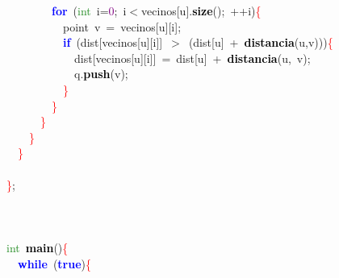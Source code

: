 \mbox{}\ \ \ \ \ \ \ \ \textbf{\textcolor{Blue}{for}}\ \textcolor{BrickRed}{(}\textcolor{ForestGreen}{int}\ i\textcolor{BrickRed}{=}\textcolor{Purple}{0}\textcolor{BrickRed}{;}\ i\textcolor{BrickRed}{$<$}vecinos\textcolor{BrickRed}{[}u\textcolor{BrickRed}{].}\textbf{\textcolor{Black}{size}}\textcolor{BrickRed}{();}\ \textcolor{BrickRed}{++}i\textcolor{BrickRed}{)}\textcolor{Red}{\{} \\
\mbox{}\ \ \ \ \ \ \ \ \ \ point\ v\ \textcolor{BrickRed}{=}\ vecinos\textcolor{BrickRed}{[}u\textcolor{BrickRed}{][}i\textcolor{BrickRed}{];} \\
\mbox{}\ \ \ \ \ \ \ \ \ \ \textbf{\textcolor{Blue}{if}}\ \textcolor{BrickRed}{(}dist\textcolor{BrickRed}{[}vecinos\textcolor{BrickRed}{[}u\textcolor{BrickRed}{][}i\textcolor{BrickRed}{]]}\ \textcolor{BrickRed}{$>$}\ \textcolor{BrickRed}{(}dist\textcolor{BrickRed}{[}u\textcolor{BrickRed}{]}\ \textcolor{BrickRed}{+}\ \textbf{\textcolor{Black}{distancia}}\textcolor{BrickRed}{(}u\textcolor{BrickRed}{,}v\textcolor{BrickRed}{)))}\textcolor{Red}{\{} \\
\mbox{}\ \ \ \ \ \ \ \ \ \ \ \ dist\textcolor{BrickRed}{[}vecinos\textcolor{BrickRed}{[}u\textcolor{BrickRed}{][}i\textcolor{BrickRed}{]]}\ \textcolor{BrickRed}{=}\ dist\textcolor{BrickRed}{[}u\textcolor{BrickRed}{]}\ \textcolor{BrickRed}{+}\ \textbf{\textcolor{Black}{distancia}}\textcolor{BrickRed}{(}u\textcolor{BrickRed}{,}\ v\textcolor{BrickRed}{);} \\
\mbox{}\ \ \ \ \ \ \ \ \ \ \ \ q\textcolor{BrickRed}{.}\textbf{\textcolor{Black}{push}}\textcolor{BrickRed}{(}v\textcolor{BrickRed}{);} \\
\mbox{}\ \ \ \ \ \ \ \ \ \ \textcolor{Red}{\}} \\
\mbox{}\ \ \ \ \ \ \ \ \textcolor{Red}{\}} \\
\mbox{}\ \ \ \ \ \ \textcolor{Red}{\}} \\
\mbox{}\ \ \ \ \textcolor{Red}{\}} \\
\mbox{}\ \ \textcolor{Red}{\}} \\
\mbox{} \\
\mbox{}\textcolor{Red}{\}}\textcolor{BrickRed}{;} \\
\mbox{} \\
\mbox{} \\
\mbox{} \\
\mbox{}\textcolor{ForestGreen}{int}\ \textbf{\textcolor{Black}{main}}\textcolor{BrickRed}{()}\textcolor{Red}{\{} \\
\mbox{}\ \ \textbf{\textcolor{Blue}{while}}\ \textcolor{BrickRed}{(}\textbf{\textcolor{Blue}{true}}\textcolor{BrickRed}{)}\textcolor{Red}{\{} \\
